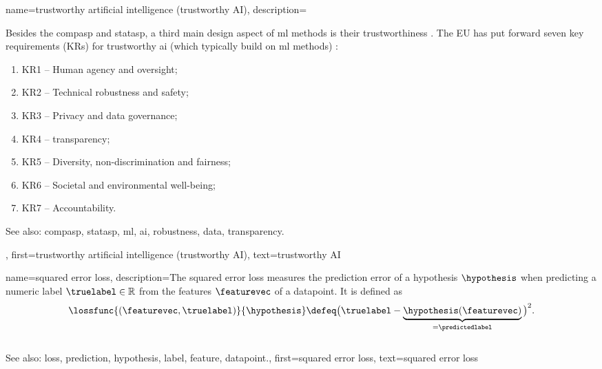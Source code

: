 {name={trustworthy artificial intelligence (trustworthy AI)},
	description={Besides the \gls{compasp} and \gls{statasp}, a third main design aspect of 
		\gls{ml} methods is their trustworthiness \cite{pfau2024engineeringtrustworthyaideveloper}. 
		The EU has put forward seven key requirements (KRs) for trustworthy 
		\gls{ai} (which typically build on \gls{ml} methods) \cite{ALTAIEU}: 
	\begin{enumerate}[label=\arabic*)]
		\item KR1 – Human agency and oversight;
		\item KR2 – Technical \gls{robustness} and safety;
		\item KR3 – Privacy and \gls{data} governance;
		\item KR4 – \Gls{transparency};
		\item KR5 – Diversity, non-discrimination and fairness; 
		\item KR6 – Societal and environmental well-being;
		\item KR7 – Accountability. 
	\end{enumerate}
		See also: \gls{compasp}, \gls{statasp}, \gls{ml}, \gls{ai}, \gls{robustness}, \gls{data}, \gls{transparency}.},
	first={trustworthy artificial intelligence (trustworthy AI)},
	text={trustworthy AI}
}

{name={squared error loss},
	description={The squared 
		error \gls{loss} measures the \gls{prediction} error of a 
		\gls{hypothesis} $\hypothesis$ when predicting a numeric \gls{label} $\truelabel \in \mathbb{R}$ 
		from the \glspl{feature} $\featurevec$ of a \gls{datapoint}. It is defined as 
		\begin{equation} 
			\nonumber
			\lossfunc{(\featurevec,\truelabel)}{\hypothesis} \defeq \big(\truelabel - \underbrace{\hypothesis(\featurevec)}_{=\predictedlabel} \big)^{2}. 
		\end{equation} 
			\\ 
		See also: \gls{loss}, \gls{prediction}, \gls{hypothesis}, \gls{label}, \gls{feature}, \gls{datapoint}.},
	first={squared error loss},
	text={squared error loss}
}


